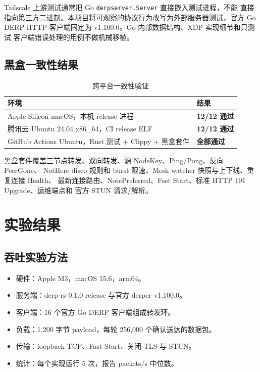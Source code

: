 \documentclass[UTF8,a4paper,zihao=-4]{ctexart}
\newcommand{\code}[1]{\texttt{\small #1}}
\newcommand{\metric}[1]{\textcolor{Primary}{\textbf{#1}}}
\begin{document}
Tailscale 上游测试通常把 Go \code{derpserver.Server} 直接嵌入测试进程，不能
直接指向第三方二进制。本项目将可观察的协议行为改写为外部服务器测试，官方
Go DERP HTTP 客户端固定为 v1.100.0。Go 内部数据结构、XDP 实现细节和只测试
客户端错误处理的用例不做机械移植。

\subsection{黑盒一致性结果}

\begin{table}[htbp]
\centering
\begin{tabularx}{0.90\textwidth}{Y C{2.7cm}}
\toprule
\textbf{环境} & \textbf{结果} \\
\midrule
Apple Silicon macOS，本机 release 进程 & \metric{12/12 通过} \\
腾讯云 Ubuntu 24.04 x86\_64，CI release ELF & \metric{12/12 通过} \\
GitHub Actions Ubuntu，Rust 测试 + Clippy + 黑盒套件 & \metric{全部通过} \\
\bottomrule
\end{tabularx}
\caption{跨平台一致性验证}
\end{table}

黑盒套件覆盖三节点转发、双向转发、源 NodeKey、Ping/Pong、反向 PeerGone、
NotHere disco 规则和 burst 限速、Mesh watcher 快照与上下线、重复连接 Health、
最新连接路由、NotePreferred、Fast Start、标准 HTTP 101 Upgrade、运维端点和
官方 STUN 请求/解析。

\section{实验结果}

\subsection{吞吐实验方法}

\begin{itemize}
  \item 硬件：Apple M3，macOS 15.6，arm64。
  \item 服务端：derp-rs 0.1.0 release 与官方 derper v1.100.0。
  \item 客户端：16 个官方 Go DERP 客户端组成转发环。
  \item 负载：1,200 字节 payload，每轮 256,000 个确认送达的数据包。
  \item 传输：loopback TCP、Fast Start、关闭 TLS 与 STUN。
  \item 统计：每个实现运行 5 次，报告 packets/s 中位数。
\end{itemize}
\end{document}

